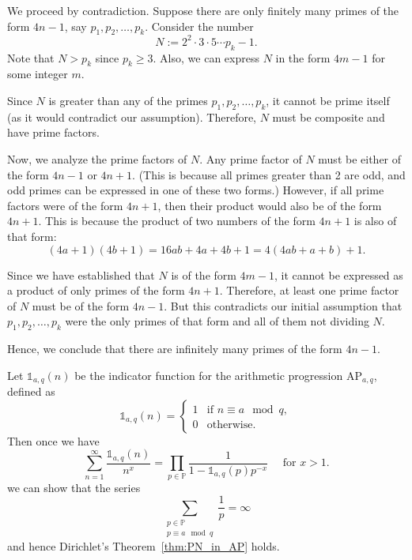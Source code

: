 \documentclass{elegantbook}
\begin{document}
\begin{solution}
  We proceed by contradiction. Suppose there are only finitely many primes of the form $4n-1$, say $p_1, p_2, \ldots, p_k$. Consider the number
  \[
    N := 2^2 \cdot 3 \cdot 5 \cdots p_k - 1.
  \]
  Note that $N > p_k$ since $p_k\geq 3$. Also, we can express $N$ in the form $4m - 1$ for some integer $m$.

  Since $N$ is greater than any of the primes $p_1, p_2, \ldots, p_k$, it cannot be prime itself (as it would contradict our assumption). Therefore, $N$ must be composite and have prime factors.

  Now, we analyze the prime factors of $N$. Any prime factor of $N$ must be either of the form $4n-1$ or $4n+1$. (This is because all primes greater than 2 are odd, and odd primes can be expressed in one of these two forms.) However, if all prime factors were of the form $4n+1$, then their product would also be of the form $4n+1$. This is because the product of two numbers of the form $4n+1$ is also of that form:
  \[
    (4a + 1)(4b + 1) = 16ab + 4a + 4b + 1 = 4(4ab + a + b) + 1.
  \]
  
  Since we have established that $N$ is of the form $4m - 1$, it cannot be expressed as a product of only primes of the form $4n+1$. Therefore, at least one prime factor of $N$ must be of the form $4n-1$. But this contradicts our initial assumption that $p_1, p_2, \ldots, p_k$ were the only primes of that form and all of them not dividing $N$.

  Hence, we conclude that there are infinitely many primes of the form $4n-1$.
\end{solution}

\begin{lemma} \label{lem:Dirichlet_Euler_product_idea}
  Let $\mathds{1}_{a,q}(n)$ be the indicator function for the arithmetic progression $\mathrm{AP}_{a,q}$, defined as
  \[
    \mathds{1}_{a,q}(n) = \begin{cases} 1 & \text{if } n \equiv a \mod q, \\ 0 & \text{otherwise}. \end{cases}
  \]
  Then once we have
  \[
    \sum_{n=1}^{\infty} \frac{\mathds{1}_{a,q}(n)}{n^x} = \prod_{p\in \mathbb{P}} \frac{1}{1 - \mathds{1}_{a,q}(p) p^{-x}} \quad \text{ for } x > 1.
  \]
  we can show that the series
  \[
    \sum_{\substack{p \in \mathbb{P} \\ p \equiv a \mod q}} \frac{1}{p} = \infty
  \]
  and hence Dirichlet's Theorem~\ref{thm:PN_in_AP} holds.
\end{lemma}
\end{document}
